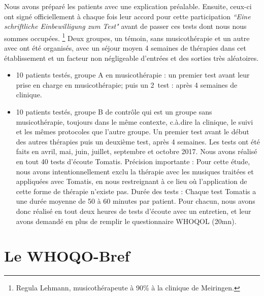  Nous avons
préparé les patients avec une explication préalable. Ensuite,
ceux-ci ont signé officiellement à chaque fois leur
accord pour cette participation  \emph{``Eine schriftliche Einbewilligung zum
Test"} avant de passer ces tests dont nous nous sommes occupées.
  \footnote{Regula
  Lehmann, musicothérapeute  à 90\%  à la clinique de Meiringen.} Deux groupes, un témoin, sans
musicothérapie et un autre avec ont été organisés, avec un séjour moyen 4 semaines de thérapies dans cet établissement et un facteur non négligeable d'entrées et des sorties très aléatoires.


\begin{itemize}
	\item 10 patients testés, groupe A en musicothérapie : un
          premier test avant leur prise en charge en musicothérapie;
          puis un 2\ieme\ test : après 4 semaines de
          clinique.
	\item 10 patients testés, groupe B de contrôle qui est un groupe sans musicothérapie,
	toujours dans le même contexte, c.à.dire la clinique, le suivi et les mêmes protocoles que l'autre groupe. Un premier test avant
	le début des autres thérapies puis un deuxième test, après 4 semaines. 
	Les tests ont été faits en avril, mai, juin, juillet, septembre et octobre 2017.
	Nous avons réalisé en tout 40 tests d'écoute Tomatis. 
	Précision importante : Pour cette étude, nous avons intentionnellement exclu la thérapie avec les musiques traitées et appliquées avec Tomatis, en nous restreignant  à ce lieu où l'application de cette forme de thérapie n'existe pas.
	Durée des tests : Chaque test Tomatis a une durée  moyenne de 50 à 60  minutes par patient. Pour chacun, nous avons donc réalisé en tout deux heures de tests d'écoute avec un entretien, et leur avons demandé en plus de remplir le questionnaire WHOQOL (20mn).
\end{itemize}

\section{Le WHOQO-Bref}

